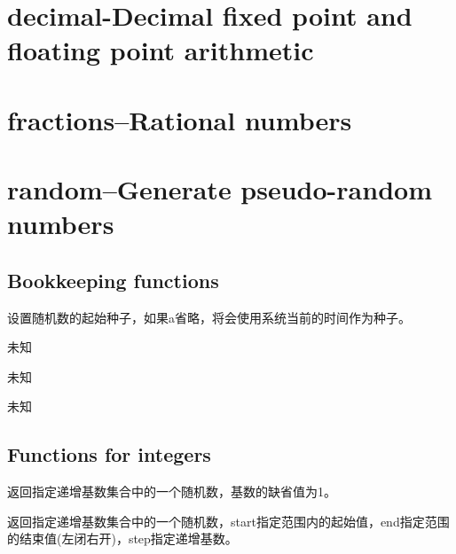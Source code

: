 \section{decimal-Decimal fixed point and floating point arithmetic}





\section{fractions--Rational numbers}





\section{random--Generate pseudo-random numbers}
\subsection{Bookkeeping functions}
\noindent{\color{red}{random.seed(a=None, version=2):}}
\par{设置随机数的起始种子，如果a省略，将会使用系统当前的时间作为种子。}\\

\noindent{\color{red}{random.getstate():}}
\par{未知}\\

\noindent{\color{red}{random.setstate(state):}}
\par{未知}\\

\noindent{\color{red}{random.getrandbits(k):}}
\par{未知}\\

\subsection{Functions for integers}
\noindent{\color{red}{random.randrange(stop):}}
\par{返回指定递增基数集合中的一个随机数，基数的缺省值为1。}\\

\noindent{\color{red}{random.randrange(start, stop[, step]):}}
\par{返回指定递增基数集合中的一个随机数，start指定范围内的起始值，end指定范围的结束值(左闭右开)，step指定递增基数。}\\

